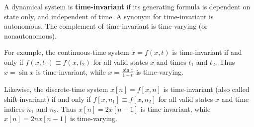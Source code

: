 \documentclass[12pt]{article}
\begin{document}
A dynamical system is {\bf time-invariant} if its generating formula is dependent on state only, and independent of time.  A synonym for time-invariant is autonomous.  The complement of time-invariant is time-varying (or nonautonomous).

For example, the continuous-time system $\dot{x}=f(x,t)$ is time-invariant if and only if $f(x,t_1)\equiv f(x,t_2)$ for all valid states $x$ and times $t_1$ and $t_2$.  Thus $\dot{x}=\sin x$ is time-invariant, while $\dot{x}=\frac{\sin x}{1+t}$ is time-varying.

Likewise, the discrete-time system $x[n]=f[x,n]$ is time-invariant (also called shift-invariant) if and only if $f[x,n_1]\equiv f[x,n_2]$ for all valid states $x$ and time indices $n_1$ and $n_2$.  Thus $x[n]=2 x[n-1]$ is time-invariant, while $x[n]=2 n x[n-1]$ is time-varying.
\end{document}
